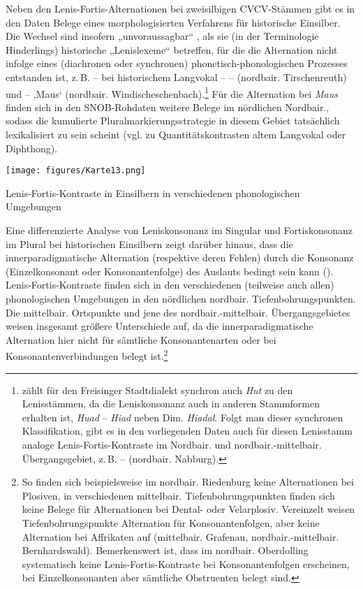 Neben den Lenis-Fortis-Alternationen bei zweisilbigen CVCV-Stämmen gibt es in den Daten Belege eines morphologisierten Verfahrens für historische Einsilber. Die Wechsel sind insofern „unvoraussagbar“ \citep[46]{Hinderling1980}, als sie (in der Terminologie Hinderlings) historische „Lenislexeme“ betreffen, für die die Alternation nicht infolge eines (diachronen oder synchronen) phonetisch-phonologischen Prozesses entstanden ist, z.\,B. -- bei historischem Langvokal --  --  (nordbair. Tirschenreuth) und  --  ‚Maus‘ (nordbair. Windischeschenbach).\footnote{\citet[329]{Zehetner1983} zählt für den Freisinger Stadtdialekt synchron auch \textit{Hut} zu den Lenisstämmen, da die Leniskonsonanz auch in anderen Stammformen erhalten ist, \textit{Huad} -- \textit{Hiad} neben Dim. \textit{Hiadal}. Folgt man dieser synchronen Klassifikation, gibt es in den vorliegenden Daten auch für diesen Lenisstamm analoge Lenis-Fortis-Kontraste im Nordbair. und nordbair.-mittelbair. Übergangsgebiet, z.\,B.  --  (nordbair. Nabburg).} Für die Alternation bei \textit{Maus} finden sich in den SNOB-Roh\-da\-ten weitere Belege im nördlichen Nordbair., sodass die kumulierte Pluralmarkierungsstrategie in diesem Gebiet tatsächlich lexikalisiert zu sein scheint (vgl.   zu Quantitätskontrasten altem Langvokal oder Diphthong).


\begin{map}
\texttt{[image: figures/Karte13.png]}
\caption{Lenis-Fortis-Kontraste in Einsilbern in verschiedenen phonologischen Umgebungen}
\label{map:13}
\end{map}

Eine differenzierte Analyse von Leniskonsonanz im Singular und Fortiskonsonanz im Plural bei historischen Einsilbern zeigt darüber hinaus, dass die innerparadigmatische Alternation (respektive deren Fehlen) durch die Konsonanz (Einzelkonsonant oder Konsonantenfolge) des Auslauts bedingt sein kann (). Lenis-Fortis-Kontraste finden sich in den verschiedenen (teilweise auch allen) phonologischen Umgebungen in den nördlichen nordbair. Tiefenbohrungspunkten. Die mittelbair. Ortspunkte und jene des nordbair.-mittelbair. Übergangsgebietes weisen insgesamt größere Unterschiede auf, da die innerparadigmatische Alternation hier nicht für sämtliche Konsonantenarten oder bei Konsonantenverbindungen belegt ist.\footnote{So finden sich beispielsweise im nordbair. Riedenburg keine Alternationen bei Plosiven, in verschiedenen mittelbair. Tiefenbohrungspunkten finden sich keine Belege für Alternationen bei Dental- oder Velarplosiv. Vereinzelt weisen Tiefenbohrungspunkte Alternation für Konsonantenfolgen, aber keine Alternation bei Affrikaten auf (mittelbair. Grafenau, nordbair.-mittelbair. Bernhardswald). Bemerkenswert ist, dass im nordbair. Oberdolling systematisch keine Lenis-Fortis-Kontraste bei Konsonantenfolgen erscheinen, bei Einzelkonsonanten aber sämtliche Obstruenten belegt sind.}

